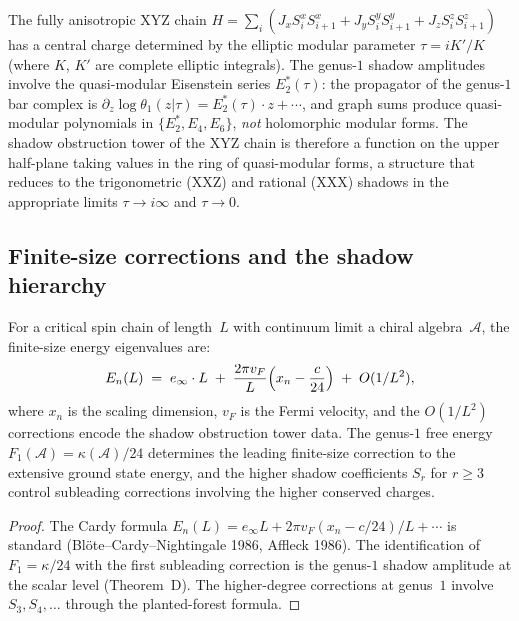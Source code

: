 \begin{remark}%
\label{rem:xyz-quasi-modular}
The fully anisotropic XYZ chain
$H = \sum_i(J_x S_i^x S_{i+1}^x + J_y S_i^y S_{i+1}^y
+ J_z S_i^z S_{i+1}^z)$ has a central charge determined by
the elliptic modular parameter $\tau = iK'/K$ (where $K$, $K'$
are complete elliptic integrals). The genus-$1$ shadow
amplitudes involve the quasi-modular Eisenstein series $E_2^*(\tau)$:
the propagator of the genus-$1$ bar complex is
$\partial_z \log \theta_1(z|\tau) = E_2^*(\tau) \cdot z + \cdots$,
and graph sums produce quasi-modular polynomials in
$\{E_2^*, E_4, E_6\}$, \emph{not} holomorphic modular forms.
The shadow obstruction tower of the XYZ chain is therefore a function on
the upper half-plane taking values in the ring of quasi-modular
forms, a structure that reduces to the trigonometric (XXZ) and
rational (XXX) shadows in the appropriate limits $\tau \to i\infty$
and $\tau \to 0$.
\end{remark}

\subsection{Finite-size corrections and the shadow hierarchy}%
\label{subsec:finite-size-shadow}

\begin{proposition}%
\label{prop:shadow-cardy-corrections}
For a critical spin chain of length~$L$ with continuum limit
a chiral algebra~$\mathcal{A}$, the finite-size energy eigenvalues
are:
\begin{equation}\label{eq:cardy-shadow}
E_n(L) \;=\; e_\infty \cdot L
\;+\; \frac{2\pi v_F}{L}\Bigl(x_n - \frac{c}{24}\Bigr)
\;+\; O(1/L^2),
\end{equation}
where $x_n$ is the scaling dimension, $v_F$ is the Fermi velocity,
and the $O(1/L^2)$ corrections encode the shadow obstruction tower data.
The genus-$1$ free energy
$F_1(\mathcal{A}) = \kappa(\mathcal{A})/24$ determines the leading
finite-size correction to the extensive ground state energy, and
the higher shadow coefficients $S_r$ for $r \ge 3$ control
subleading corrections involving the higher conserved charges.
\end{proposition}

\begin{proof}
The Cardy formula $E_n(L) = e_\infty L + 2\pi v_F(x_n - c/24)/L
+ \cdots$ is standard
(Bl\"ote--Cardy--Nightingale 1986, Affleck 1986).
The identification of $F_1 = \kappa/24$ with the first subleading
correction is the genus-$1$ shadow amplitude at the scalar level
(Theorem~D). The higher-degree corrections at genus~$1$ involve
$S_3, S_4, \ldots$ through the planted-forest formula.
\end{proof}

